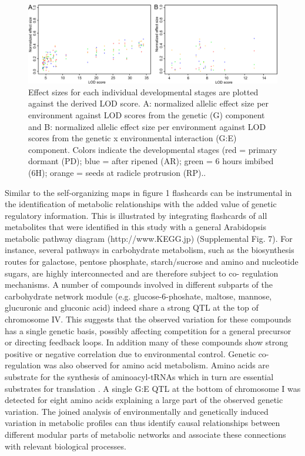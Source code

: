 \begin{figure}[h!]
  \centering
  \includegraphics[keepaspectratio,scale=0.30]{eps/image_3_2_3.eps}
  \caption[Effect sizes]{Effect sizes for each individual developmental stages are plotted against the derived 
          LOD score. A: normalized allelic effect size per environment against LOD scores from the genetic (G) 
          component and B: normalized allelic effect size per environment against LOD scores from the genetic 
          x environmental interaction (G:E) component. Colors indicate the developmental stages (red = primary 
          dormant (PD); blue = after ripened (AR); green = 6 hours imbibed (6H); orange = seeds at radicle protrusion (RP)..}
\end{figure}

Similar to the self-organizing maps in figure 1 flashcards can be instrumental in the identification of 
metabolic relationships with the added value of genetic regulatory information. This is illustrated by 
integrating flashcards of all metabolites that were identified in this study with a general Arabidopsis 
metabolic pathway diagram (http://www.KEGG.jp) (Supplemental Fig. 7). For instance, several pathways in 
carbohydrate metabolism, such as the biosynthesis routes for galactose, pentose phosphate, starch/sucrose 
and amino and nucleotide sugars, are highly interconnected and are therefore subject to co- regulation 
mechanisms. A number of compounds involved in different subparts of the carbohydrate network module (e.g. 
glucose-6-phoshate, maltose, mannose, glucuronic and gluconic acid) indeed share a strong QTL at the top 
of chromosome IV. This suggests that the observed variation for these compounds has a single genetic basis, 
possibly affecting competition for a general precursor or directing feedback loops. In addition many of 
these compounds show strong positive or negative correlation due to environmental control. Genetic 
co-regulation was also observed for amino acid metabolism. Amino acids are substrate for the synthesis of 
aminoacyl-tRNAs which in turn are essential substrates for translation \cite{Sheppard:2008}. A single 
G:E QTL at the bottom of chromosome I was detected for eight amino acids explaining a large part of the 
observed genetic variation. The joined analysis of environmentally and genetically induced variation in 
metabolic profiles can thus identify causal relationships between different modular parts of metabolic 
networks and associate these connections with relevant biological processes.

